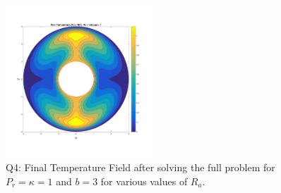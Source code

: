 \documentclass{article}
\begin{document}
\begin{figure}[h!]
		\includegraphics[width = 0.49\textwidth]{fig_q4ra1000b3}
		\caption{Q4: Final Temperature Field after solving the full problem for $P_r = \kappa = 1$ and $b=3$ for various values of $R_a$.}
		\label{fig:q4Rab3}
	\end{figure}
\end{document}
